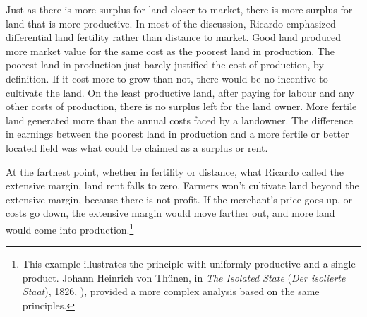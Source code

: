 Just as there is more surplus for land closer to market, there is more surplus for land that is more productive. In most of the discussion, Ricardo emphasized differential land fertility rather than distance to market. %
Good land produced more market value for the same cost as the poorest land in production. The poorest land in production just barely justified the cost of production, by definition. If it cost more to grow than not, there would be no incentive to cultivate the land. On the least productive land, after paying for labour and any other costs of production, there is no surplus left for the land owner. More fertile land generated more than the annual costs faced by a landowner. %
The difference in earnings between the poorest land in production and a more fertile or better located field was what could be claimed as a surplus or rent. %

At the farthest point, whether in fertility or distance, what Ricardo called the extensive margin, land rent falls to zero. %
Farmers won't cultivate land beyond the extensive margin, because there is not profit. %
If the merchant's price goes up, or costs go down, the \gls{extensive margin} would move farther out, and more land would come into production.\footnote{This example illustrates the principle with %
uniformly productive and a single product. Johann Heinrich von Th\"unen, in \textit{The Isolated State} (\textit{Der isolierte Staat}), 1826, \cite{vonthunenIsolirteStaatBeziehung1826}), provided a more complex analysis based on the same principles.} %





